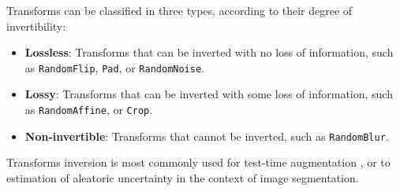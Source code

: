 Transforms can be classified in three types, according to their degree of invertibility:
\begin{itemize}
  \item \textbf{Lossless}: Transforms that can be inverted with no loss of information, such as \texttt{RandomFlip}, \texttt{Pad}, or \texttt{RandomNoise}.

  \item \textbf{Lossy}: Transforms that can be inverted with some loss of information, such as \texttt{RandomAffine}, or \texttt{Crop}.

  \item \textbf{Non-invertible}: Transforms that cannot be inverted, such as \texttt{RandomBlur}.
\end{itemize}

Transforms inversion is most commonly used for test-time augmentation \cite{moshkov_test-time_2020}, or to estimation of aleatoric uncertainty \cite{wang_aleatoric_2019} in the context of image segmentation.
